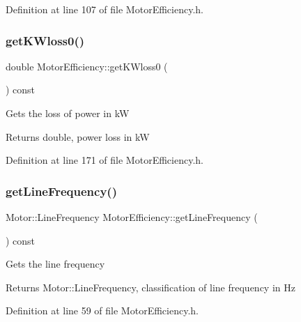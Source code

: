 Definition at line 107 of file Motor\+Efficiency.\+h.

\mbox{\label{class_motor_efficiency_a47398ac8203f5b79a0ca435673a4bc16}} 
\subsubsection{\texorpdfstring{get\+K\+Wloss0()}{getKWloss0()}}
{\footnotesize\ttfamily double Motor\+Efficiency\+::get\+K\+Wloss0 (\begin{DoxyParamCaption}{ }\end{DoxyParamCaption}) const\hspace{0.3cm}{\ttfamily [inline]}}

Gets the loss of power in kW \begin{DoxyReturn}{Returns}
double, power loss in kW 
\end{DoxyReturn}


Definition at line 171 of file Motor\+Efficiency.\+h.

\mbox{\label{class_motor_efficiency_a3cc0ed606154a04d035399e05d1cb02a}} 
\subsubsection{\texorpdfstring{get\+Line\+Frequency()}{getLineFrequency()}}
{\footnotesize\ttfamily Motor\+::\+Line\+Frequency Motor\+Efficiency\+::get\+Line\+Frequency (\begin{DoxyParamCaption}{ }\end{DoxyParamCaption}) const\hspace{0.3cm}{\ttfamily [inline]}}

Gets the line frequency \begin{DoxyReturn}{Returns}
Motor\+::\+Line\+Frequency, classification of line frequency in Hz 
\end{DoxyReturn}


Definition at line 59 of file Motor\+Efficiency.\+h.

\mbox{\label{class_motor_efficiency_a955906509a4b49274b35c1b119c4a4b4}} 
